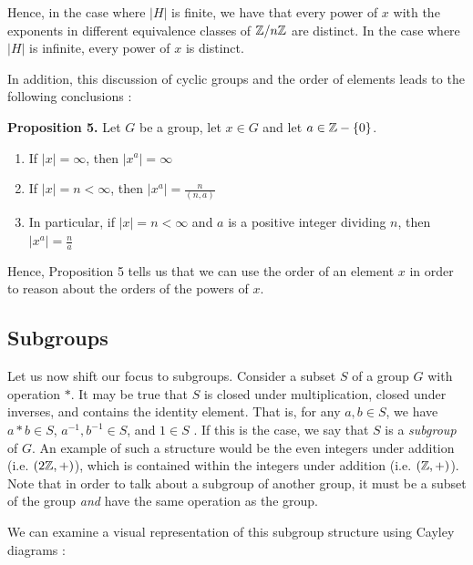 \documentclass[11pt, reqno]{amsart}
\theoremstyle{plain}
\theoremstyle{definition}
\theoremstyle{example}
\begin{document}
Hence, in the case where $|H|$ is finite, we have that every power of $x$ with the exponents in different equivalence classes of $\mathbb{Z}/n\mathbb{Z}$ are distinct. In the case where $|H|$ is infinite, every power of $x$ is distinct.

\par
In addition, this discussion of cyclic groups and the order of elements leads to the following conclusions \cite[\S 2.3, p.57]{dummit}:

\par
\textbf{Proposition 5.} Let $G$ be a group, let $x \in G$ and let $a \in \mathbb{Z} - \{0\}$.
\begin{enumerate}

\item If $|x| = \infty$, then $|x^a| = \infty$

\item If $|x| = n < \infty$, then $|x^a| = \frac{n}{(n, a)}$

\item In particular, if $|x| = n < \infty$ and $a$ is a positive integer dividing $n$, then $|x^a| = \frac{n}{a}$
\end{enumerate}

\par
Hence, Proposition 5 tells us that we can use the order of an element $x$ in order to reason about the orders of the powers of $x$.

\subsection{Subgroups}

\par
Let us now shift our focus to subgroups. Consider a subset $S$ of a group $G$ with operation $*$. It may be true that $S$ is closed under multiplication, closed under inverses, and contains the identity element. That is, for any $a, b \in S$, we have $a * b \in S$, $a^{-1}, b^{-1} \in S$, and $1 \in S$ \cite{pinter}. If this is the case, we say that $S$ is a \textit{subgroup} of $G$. An example of such a structure would be the even integers under addition (i.e. $(2\mathbb{Z}, +)$), which is contained within the integers under addition (i.e. $(\mathbb{Z}, +)$). Note that in order to talk about a subgroup of another group, it must be a subset of the group \textit{and} have the same operation as the group. 

\par
We can examine a visual representation of this subgroup structure using Cayley diagrams \cite[\S 6.2, p. 100]{carter}:
\end{document}
